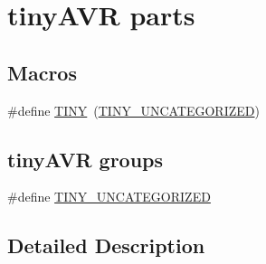 \hypertarget{group__tiny__part__macros__group}{\section{tiny\-A\-V\-R parts}
\label{group__tiny__part__macros__group}
}
\subsection*{Macros}
\begin{DoxyCompactItemize}
\item 
\#define \hyperlink{group__tiny__part__macros__group_gacf1c38f71f39386356edb151a131ad11}{T\-I\-N\-Y}~(\hyperlink{group__tiny__part__macros__group_ga82ec23e0742b1f94e206d669f5d18f34}{T\-I\-N\-Y\-\_\-\-U\-N\-C\-A\-T\-E\-G\-O\-R\-I\-Z\-E\-D})
\end{DoxyCompactItemize}
\subsection*{tiny\-A\-V\-R groups}
\begin{DoxyCompactItemize}
\item 
\#define \hyperlink{group__tiny__part__macros__group_ga82ec23e0742b1f94e206d669f5d18f34}{T\-I\-N\-Y\-\_\-\-U\-N\-C\-A\-T\-E\-G\-O\-R\-I\-Z\-E\-D}
\end{DoxyCompactItemize}


\subsection{Detailed Description}


